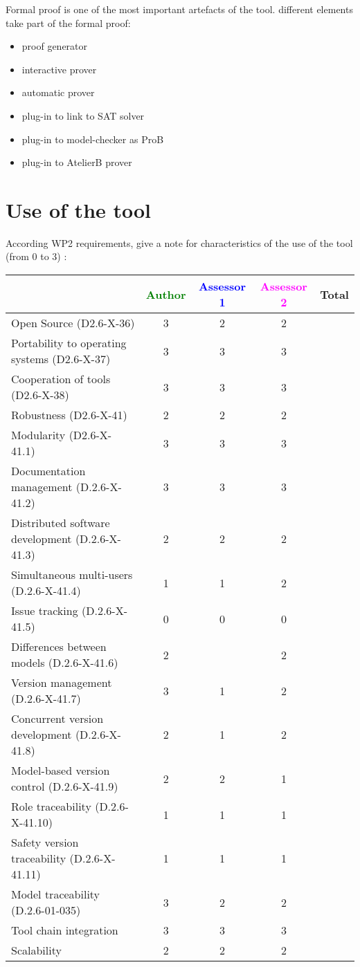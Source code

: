 \begin{author_comment}

Formal proof is one of the most important artefacts of the tool. different elements take part of the formal proof:
\begin{itemize}
\item proof generator
\item interactive prover
\item automatic prover
\item plug-in to link to SAT solver
\item plug-in to model-checker as ProB
\item plug-in to AtelierB prover
\end{itemize}
\end{author_comment}


\section{Use of the tool}


According WP2 requirements, give a note for characteristics of the use of the tool (from 0 to 3) :

\begin{tabular}{|l | c | c | c | c|}
\hline
& \textcolor{green}{Author} & \textcolor{blue}{Assessor 1} & \textcolor{magenta}{Assessor 2} & Total \\
\hline 
Open Source (D2.6-X-36) & 3 & 2 & 2 &  \\
\hline 
Portability to operating systems (D2.6-X-37) & 3 & 3 & 3 &  \\
\hline
Cooperation of tools (D2.6-X-38) & 3 & 3 & 3 &  \\
\hline
Robustness (D2.6-X-41) & 2 & 2 & 2 & \\
\hline
Modularity (D2.6-X-41.1) & 3 & 3 & 3 & \\
\hline
Documentation management (D.2.6-X-41.2) & 3 & 3 & 3 & \\
\hline
Distributed software development (D.2.6-X-41.3)  & 2 & 2 & 2 & \\
\hline
Simultaneous multi-users (D.2.6-X-41.4)   & 1 & 1 & 2 & \\
\hline
Issue tracking (D.2.6-X-41.5) & 0 & 0 & 0 & \\
\hline
Differences between models (D.2.6-X-41.6) & 2 & & 2 & \\
\hline
Version management (D.2.6-X-41.7) & 3 & 1 & 2 & \\
\hline
Concurrent version development (D.2.6-X-41.8) & 2 & 1 & 2 & \\
\hline
Model-based version control (D.2.6-X-41.9) & 2 & 2 & 1 & \\
\hline
Role traceability (D.2.6-X-41.10) & 1 & 1 & 1 & \\
\hline
Safety version traceability (D.2.6-X-41.11) & 1 & 1 & 1 & \\
\hline
Model traceability (D.2.6-01-035) & 3 & 2 & 2 & \\
\hline
Tool chain integration & 3 & 3 & 3 & \\
\hline
Scalability & 2 & 2 & 2 & \\
\hline
\end{tabular}

